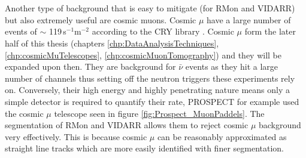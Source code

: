 \\\\Another type of background that is easy to mitigate (for RMon and VIDARR) but also extremely useful are cosmic muons. Cosmic $\mu$ have a large number of events of $\sim$ 119\,s$^{-1}$m$^{-2}$ according to the CRY library \cite{ieee_cry_2007}. Cosmic $\mu$ form the later half of this thesis (chapters \ref{chp:DataAnalysisTechniques}, \ref{chp:cosmicMuTelescopes}, \ref{chp:cosmicMuonTomography}) and they will be expanded upon then. They are background for $\bar{\nu}$ events as they hit a large number of channels thus setting off the neutron triggers these experiments rely on. Conversely, their high energy and highly penetrating nature means only a simple detector is required to quantify their rate, PROSPECT for example used the cosmic $\mu$ telescope seen in figure \ref{fig:Prospect_MuonPaddels}. The segmentation of RMon and VIDARR allows them to reject cosmic $\mu$ background very effectively. This is because cosmic $\mu$ can be reasonably approximated as straight line tracks which are more easily identified with finer segmentation. %


